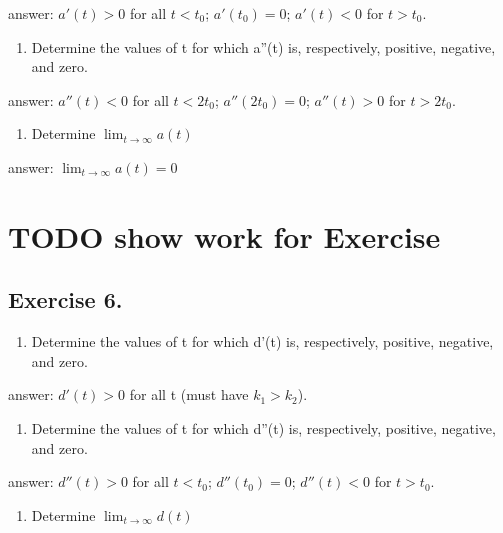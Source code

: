 \documentclass[]{article}
\providecommand{\tightlist}{%
  \setlength{\itemsep}{0pt}\setlength{\parskip}{0pt}}
\begin{document}
answer: \(a'(t) > 0\) for all \(t < t_0\); \(a'(t_0) =0\); \(a'(t) < 0\)
for \(t > t_0\).

\begin{enumerate}
\def\labelenumi{(\alph{enumi})}
\setcounter{enumi}{1}
\tightlist
\item
  Determine the values of t for which a''(t) is, respectively, positive,
  negative, and zero.
\end{enumerate}

answer: \(a''(t) < 0\) for all \(t < 2t_0\); \(a''(2t_0) =0\);
\(a''(t) > 0\) for \(t > 2t_0\).

\begin{enumerate}
\def\labelenumi{(\alph{enumi})}
\setcounter{enumi}{2}
\tightlist
\item
  Determine \(\lim_{t\to\infty}a(t)\)
\end{enumerate}

answer: \(\lim_{t\to\infty}a(t) =0\)

\section{TODO show work for Exercise}\label{todo-show-work-for-exercise}

\subsection{Exercise 6.}\label{exercise-6.}

\begin{enumerate}
\def\labelenumi{(\alph{enumi})}
\tightlist
\item
  Determine the values of t for which d'(t) is, respectively, positive,
  negative, and zero.
\end{enumerate}

answer: \(d'(t) > 0\) for all t (must have \(k_1 > k_2\)).

\begin{enumerate}
\def\labelenumi{(\alph{enumi})}
\setcounter{enumi}{1}
\tightlist
\item
  Determine the values of t for which d''(t) is, respectively, positive,
  negative, and zero.
\end{enumerate}

answer: \(d''(t) > 0\) for all \(t < t_0\); \(d''(t_0) =0\);
\(d''(t) < 0\) for \(t > t_0\).

\begin{enumerate}
\def\labelenumi{(\alph{enumi})}
\setcounter{enumi}{2}
\tightlist
\item
  Determine \(\lim_{t\to\infty}d(t)\)
\end{enumerate}
\end{document}
